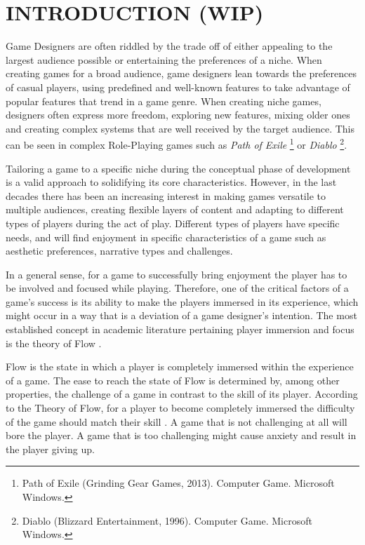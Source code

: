 \chapter{INTRODUCTION (WIP)}

Game Designers are often riddled by the trade off of either appealing to the largest audience possible or entertaining the preferences of a niche. When creating games for a broad audience, game designers lean towards the preferences of casual players, using predefined and well-known features to take advantage of popular features that trend in a game genre. When creating niche games, designers often express more freedom, exploring new features, mixing older ones and creating complex systems that are well received by the target audience. This can be seen in complex Role-Playing games such as \emph{Path of Exile} \footnote{Path of Exile (Grinding Gear Games, 2013). Computer Game. Microsoft Windows.} or \emph{Diablo} \footnote{Diablo (Blizzard Entertainment, 1996). Computer Game. Microsoft Windows.}.

Tailoring a game to a specific niche during the conceptual phase of development is a valid approach to solidifying its core characteristics. However, in the last decades there has been an increasing interest in making games versatile to multiple audiences, creating flexible layers of content and adapting to different types of players during the act of play. Different types of players have specific needs, and will find enjoyment in specific characteristics of a game such as aesthetic preferences, narrative types and challenges.

In a general sense, for a game to successfully bring enjoyment the player has to be involved and focused while playing. Therefore, one of the critical factors of a game's success is its ability to make the players immersed in its experience, which might occur in a way that is a deviation of a game designer's intention. The most established concept in academic literature pertaining player immersion and focus is the theory of Flow \cite{BOOK_Flow}. 

Flow is the state in which a player is completely immersed within the experience of a game. The ease to reach the state of Flow is determined by, among other properties, the challenge of a game in contrast to the skill of its player. According to the Theory of Flow, for a player to become completely immersed the difficulty of the game should match their skill \cite{ARTICLE_FlowInGames}. A game that is not challenging at all will bore the player. A game that is too challenging might cause anxiety and result in the player giving up. 

